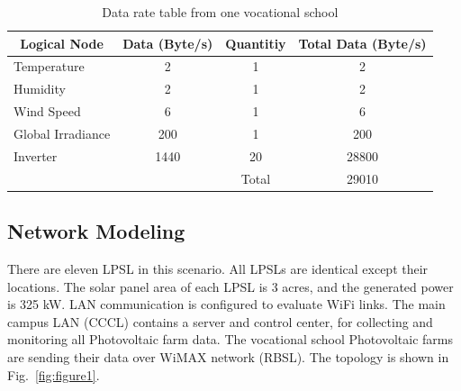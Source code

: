 \documentclass[conference, letterpaper]{IEEEtran}
\begin{document}
\begin{table}[htbp]
\caption{Data rate table from one vocational school}
\label{tab:table3}
\centering
\begin{tabular}{lccc}
\hline
\multicolumn{1}{c}{Logical Node} & \multicolumn{1}{l}{Data (Byte/s)} & \multicolumn{1}{l}{Quantitiy} & \multicolumn{1}{l}{Total Data (Byte/s)} \\ \hline
Temperature                      & 2                                 & 1                             & 2                                       \\
Humidity                         & 2                                 & 1                             & 2                                       \\
Wind Speed                       & 6                                 & 1                             & 6                                       \\
Global Irradiance                & 200                               & 1                             & 200                                     \\
Inverter                          & 1440                               & 20                            & 28800                                \\ \hline        
& & Total & 29010 \\
\end{tabular}
\end{table}


\subsection{Network Modeling}

There are eleven LPSL in this scenario. All LPSLs are identical except their locations. The solar panel area of each LPSL is 3 acres, and the generated power is 325 kW. LAN communication is configured to evaluate WiFi links. The main campus LAN (CCCL) contains a server and control center, for collecting and monitoring all Photovoltaic farm data. The vocational school Photovoltaic farms are sending their data over WiMAX network (RBSL). The topology is shown in Fig.~\ref{fig:figure1}.
\end{document}
